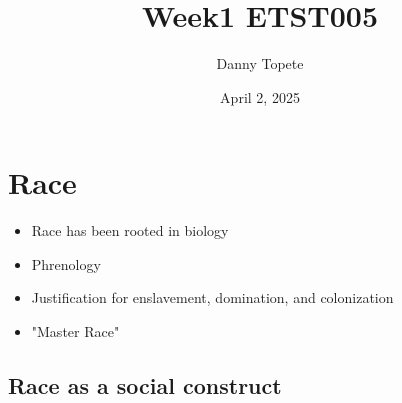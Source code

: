 \documentclass{article}
\title{Week1 ETST005}
\author{Danny Topete}
\date{April 2, 2025}
\begin{document}
\maketitle

\section{Race}
\begin{itemize}
  \item Race has been rooted in biology
  \item Phrenology
  \item Justification for enslavement, domination, and colonization
  \item "Master Race"
\end{itemize}

\subsection{Race as a social construct}
\end{document}
